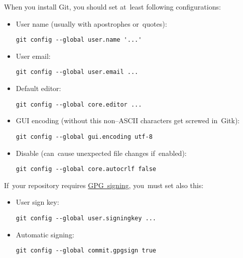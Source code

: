 \label{gitbasicconfiguration}
When you install Git, you should set at~least following configurations:
\begin{itemize}
    \item User name (usually with apostrophes or~quotes):
        \begin{lstlisting}[frame=no, gobble=12]
            git config --global user.name '...'
        \end{lstlisting}
    \item User email:
        \begin{lstlisting}[frame=no, gobble=12]
            git config --global user.email ...
        \end{lstlisting}
    \item Default editor:
        \begin{lstlisting}[frame=no, gobble=12]
            git config --global core.editor ...
        \end{lstlisting}
    \item GUI encoding (without this non--ASCII characters get screwed in~Gitk):
        \begin{lstlisting}[frame=no, gobble=12]
            git config --global gui.encoding utf-8
        \end{lstlisting}
    \item Disable  (can~cause unexpected file changes if~enabled):
        \begin{lstlisting}[frame=no, gobble=12]
            git config --global core.autocrlf false
        \end{lstlisting}
\end{itemize}
\noindent If~your repository requires \hyperref[gitgpg]{GPG~signing}, you~must set also this:
\begin{itemize}
    \item User sign key:
        \begin{lstlisting}[frame=no, gobble=12]
            git config --global user.signingkey ...
        \end{lstlisting}
    \item Automatic signing:
        \begin{lstlisting}[frame=no, gobble=12]
            git config --global commit.gpgsign true
        \end{lstlisting}
\end{itemize}
